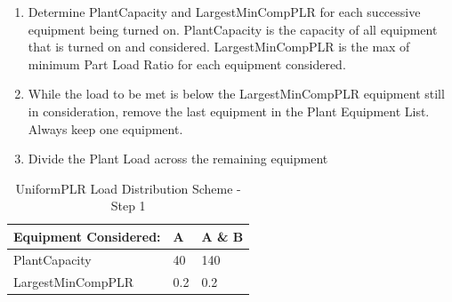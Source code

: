 \begin{enumerate}
    \def\labelenumi{Step \arabic{enumi}:}
\item
    Determine PlantCapacity and LargestMinCompPLR for each successive equipment being turned on.
    PlantCapacity is the capacity of all equipment that is turned on and considered.
    LargestMinCompPLR is the max of minimum Part Load Ratio for each equipment considered.
\item
    While the load to be met is below the LargestMinCompPLR equipment still in consideration, remove the last equipment in the Plant Equipment List. Always keep one equipment.
\item
    Divide the Plant Load across the remaining equipment
\end{enumerate}


\begin{table}[htbp]
    \centering
    \caption{UniformPLR Load Distribution Scheme - Step 1}
    \label{tab:uniformplr-load-overview}
\begin{tabular}{|l|l|l|}
\hline
Equipment Considered: & A & A \& B \\ \hline
PlantCapacity & 40 & 140 \\ \hline
LargestMinCompPLR & 0.2 & 0.2 \\ \hline
\end{tabular}
\end{table}

